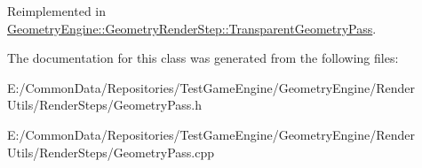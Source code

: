 Reimplemented in \mbox{\hyperlink{class_geometry_engine_1_1_geometry_render_step_1_1_transparent_geometry_pass_a22bae026c0e006318d5ab21bdaeeb247}{Geometry\+Engine\+::\+Geometry\+Render\+Step\+::\+Transparent\+Geometry\+Pass}}.



The documentation for this class was generated from the following files\+:\begin{DoxyCompactItemize}
\item 
E\+:/\+Common\+Data/\+Repositories/\+Test\+Game\+Engine/\+Geometry\+Engine/\+Render Utils/\+Render\+Steps/Geometry\+Pass.\+h\item 
E\+:/\+Common\+Data/\+Repositories/\+Test\+Game\+Engine/\+Geometry\+Engine/\+Render Utils/\+Render\+Steps/Geometry\+Pass.\+cpp\end{DoxyCompactItemize}
